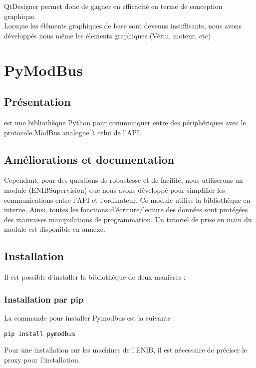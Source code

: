 QtDesigner permet donc de gagner en efficacité en terme de conception graphique. \\
Lorsque les éléments graphiques de base sont devenus insuffisants, nous avons développés nous même les élements graphiques (Vérin, moteur, etc)



\section{PyModBus}
\subsection{Présentation}
 est une bibliothèque Python pour communiquer entre des périphériques avec le protocole ModBus analogue à celui de l'API.

\subsection{Améliorations et documentation}

Cependant, pour des questions de robustesse et de facilité, nous utiliserons un module (ENIBSupervision) que nous avons développé pour simplifier les communications entre l'API et l'ordinateur. \newline
Ce module utilise la bibliothèque  en interne.
 Ainsi, toutes les fonctions d'écriture/lecture des données sont protégées des mauvaises manipulations de programmation. \newline
Un tutoriel de prise en main du module  est disponible en annexe.

\subsection{Installation}

Il est possible d'installer la bibliothèque  de deux manières : \newline

\subsubsection{Installation par pip}
La commande pour installer Pymodbus est la suivante :
\begin{lstlisting}
pip install pymodbus
\end{lstlisting}

Pour une installation sur les machines de l'ENIB, il est nécessaire de préciser le proxy pour l'installation. \newline 

